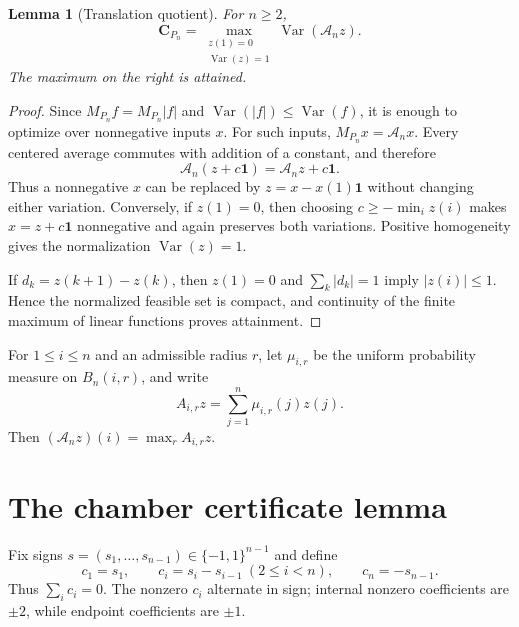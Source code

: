 \documentclass[11pt]{amsart}
\newtheorem{lemma}[theorem]{Lemma}
\theoremstyle{definition}
\DeclareMathOperator{\Var}{Var}
\newcommand{\Cpath}[1]{\mathbf C_{P_{#1}}}
\newcommand{\one}{\mathbf 1}
\begin{document}
\begin{lemma}[Translation quotient]\label{lem:quotient}
For $n\geq2$,
\begin{equation}\label{eq:quotient}
  \Cpath n=
  \max_{\substack{z(1)=0\\ \Var(z)=1}}
  \Var(\mathcal A_n z).
\end{equation}
The maximum on the right is attained.
\end{lemma}

\begin{proof}
Since $M_{P_n}f=M_{P_n}|f|$ and
$\Var(|f|)\leq\Var(f)$, it is enough to optimize over nonnegative inputs
$x$.  For such inputs, $M_{P_n}x=\mathcal A_nx$.  Every centered average
commutes with addition of a constant, and therefore
\[
  \mathcal A_n(z+c\one)=\mathcal A_nz+c\one.
\]
Thus a nonnegative $x$ can be replaced by $z=x-x(1)\one$ without changing
either variation.  Conversely, if $z(1)=0$, then choosing
$c\geq-\min_i z(i)$ makes $x=z+c\one$ nonnegative and again preserves both
variations.  Positive homogeneity gives the normalization $\Var(z)=1$.

If $d_k=z(k+1)-z(k)$, then $z(1)=0$ and $\sum_k|d_k|=1$ imply
$|z(i)|\leq1$.  Hence the normalized feasible set is compact, and continuity
of the finite maximum of linear functions proves attainment.
\end{proof}

For $1\leq i\leq n$ and an admissible radius $r$, let $\mu_{i,r}$ be the
uniform probability measure on $B_n(i,r)$, and write
\[
  A_{i,r}z=\sum_{j=1}^n\mu_{i,r}(j)z(j).
\]
Then $(\mathcal A_nz)(i)=\max_r A_{i,r}z$.

\section{The chamber certificate lemma}

Fix signs $s=(s_1,\ldots,s_{n-1})\in\{-1,1\}^{n-1}$ and define
\begin{equation}\label{eq:c-def}
  c_1=s_1,\qquad c_i=s_i-s_{i-1}\ (2\leq i<n),
  \qquad c_n=-s_{n-1}.
\end{equation}
Thus $\sum_i c_i=0$.  The nonzero $c_i$ alternate in sign; internal nonzero
coefficients are $\pm2$, while endpoint coefficients are $\pm1$.
\end{document}
